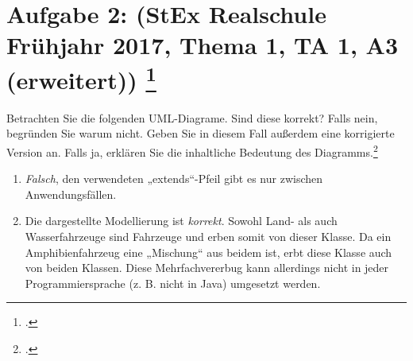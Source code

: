 \documentclass{lehramt-informatik}
\begin{document}
%

\section{Aufgabe 2: (StEx Realschule Frühjahr 2017, Thema 1, TA 1, A3
(erweitert)) \footcite{sosy:ab:3}}

Betrachten Sie die folgenden UML-Diagrame. Sind diese korrekt? Falls
nein, begründen Sie warum nicht. Geben Sie in diesem Fall außerdem eine
korrigierte Version an. Falls ja, erklären Sie die inhaltliche Bedeutung
des Diagramms.\footcite{examen:46116:2017:03}

\begin{enumerate}
\item \strut


\begin{antwort}
\emph{Falsch}, den verwendeten „extends“-Pfeil gibt es nur zwischen
Anwendungsfällen.

\end{antwort}

\item \strut


\begin{antwort}
Die dargestellte Modellierung ist \emph{korrekt}. Sowohl Land- als auch
Wasserfahrzeuge sind Fahrzeuge und erben somit von dieser Klasse. Da
ein Amphibienfahrzeug eine „Mischung“ aus beidem ist, erbt diese Klasse
auch von beiden Klassen. Diese Mehrfachvererbug kann allerdings nicht
in jeder Programmiersprache (z. B. nicht in Java) umgesetzt
werden.
\end{antwort}


\end{enumerate}
\end{document}
